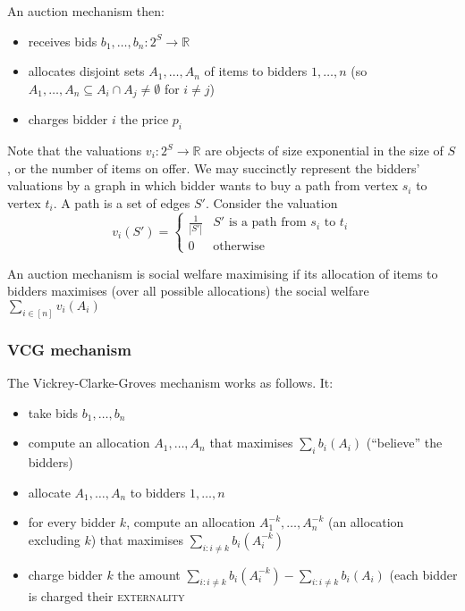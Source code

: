 		An auction mechanism then:
		\begin{itemize}
			\itemsep0em
			\item receives bids $b_1, \ldots, b_n : 2^S \rightarrow \mathbb{R}$
			\item allocates disjoint sets $A_1, \ldots, A_n$ of items to
				bidders $1, \ldots, n$ (so $A_1, \ldots, A_n \subseteq A_i \cap
				A_j \neq \emptyset$ for $i \neq j$)
			\item charges bidder $i$ the price $p_i$
		\end{itemize}

		Note that the valuations $v_i : 2^S \rightarrow \mathbb{R}$ are objects
		of size exponential in the size of $S$, or the number of items on
		offer.
		We may succinctly represent the bidders' valuations by a graph in which
		bidder wants to buy a path from vertex $s_i$ to vertex $t_i$. A path is
		a set of edges $S'$. Consider the valuation
		\begin{equation*}
			v_i(S') = \begin{cases}
				\frac{1}{|S'|} & \text{$S'$ is a path from $s_i$ to $t_i$} \\
				0 & \text{otherwise}
			\end{cases}
		\end{equation*}

		\begin{definition}
			An auction mechanism is social welfare maximising if its allocation
			of items to bidders maximises (over all possible allocations) the
			social welfare $\sum_{i \in [n]} v_i(A_i)$
		\end{definition}

		\subsubsection{VCG mechanism}
			The Vickrey-Clarke-Groves mechanism works as follows. It:
			\begin{itemize}
				\item take bids $b_1, \ldots, b_n$
				\item compute an allocation $A_1, \ldots, A_n$ that maximises
					$\sum_i b_i(A_i)$ (``believe'' the bidders)
				\item allocate $A_1, \ldots, A_n$ to bidders $1, \ldots, n$
				\item for every bidder $k$, compute an allocation $A_1^{-k},
					\ldots, A_n^{-k}$ (an allocation excluding $k$) that
					maximises $\sum_{i: i \neq k} b_i(A_i^{-k})$
				\item charge bidder $k$ the amount $\sum_{i: i \neq k}
					b_i(A_i^{-k}) - \sum_{i: i \neq k} b_i(A_i)$ (each bidder
					is charged their \textsc{externality}
			\end{itemize}


